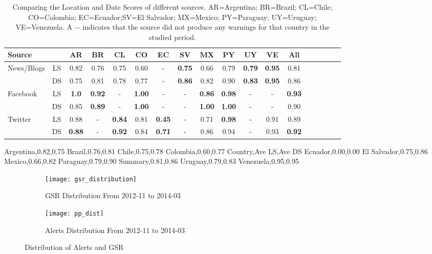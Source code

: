 \begin{table*} %
\centering
\caption{Comparing the Location and Date Scores of different sources. AR=Argentina; BR=Brazil; CL=Chile; CO=Colombia; EC=Ecuador;SV=El Salvador; MX=Mexico; PY=Paraguay; UY=Uruguay; VE=Venezuela. A $-$ indicates that the source did not produce any warnings for that country in the studied period.}
\vspace{-2mm}
\label{tb:modelwisecomparison}
\begin{tabular}{||l|*{17}{c|}}
\hline
Source& & AR & BR & CL & CO & EC & SV & MX & PY & UY & VE & All\\
\hline
\multirow{2}{*}{News/Blogs} &LS &0.82&0.76&0.75&0.60&-&{\bf0.75}&0.66&0.79&{\bf0.79}&{\bf0.95}&0.81\\
                            &DS&0.75&0.81&0.78&0.77&-&{\bf0.86}&0.82&0.90&{\bf0.83}&{\bf0.95}&0.86\\
\hline
\multirow{2}{*}{Facebook} &LS &{\bf1.0}&{\bf0.92}&-&{\bf1.00}&-&-&{\bf0.86}&{\bf0.98}&-&-&{\bf0.93}\\
                          &DS&0.85&{\bf0.89}&-&{\bf1.00}&-&-&{\bf1.00}&{\bf1.00}&-&-&0.90\\
\hline
\multirow{2}{*}{Twitter} &LS &0.88&-&{\bf0.84}&0.81&{\bf0.45}&-&0.71&{\bf0.98}&-&0.91&0.89\\
                         &DS&{\bf0.88}&-&{\bf0.92}&0.84&{\bf0.71}&-&0.86&0.94&-&0.93&{\bf0.92}\\
\hline
\end{tabular}
\vspace{-4mm}
\end{table*}

Argentina,0.82,0.75
Brazil,0.76,0.81
Chile,0.75,0.78
Colombia,0.60,0.77
Country,Ave LS,Ave DS
Ecuador,0.00,0.00
El Salvador,0.75,0.86
Mexico,0.66,0.82
Paraguay,0.79,0.90
Summary,0.81,0.86
Uruguay,0.79,0.83
Venezuela,0.95,0.95

\begin{figure*}
\centering
\begin{subfigure}{\columnwidth}
  \centering
  \texttt{[image: gsr\_distribution]}
  \caption{GSR Distribution From 2012-11 to 2014-03}
  \label{fig:gsrdistribution}
\end{subfigure}%
\begin{subfigure}{\columnwidth}
  \centering
  \texttt{[image: pp\_dist]}
  \caption{Alerts Distribution From 2012-11 to 2014-03}
  \label{fig:ppdistribution}
\end{subfigure}
\caption{Distribution of Alerts and GSR}
\label{fig:distribution}
\end{figure*}

